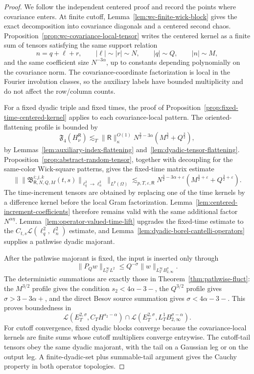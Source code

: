 \documentclass[10pt]{amsart}
\numberwithin{equation}{section}
\theoremstyle{plain}
\theoremstyle{definition}
\theoremstyle{remark}
\newcommand{\eps}{\varepsilon}
\begin{document}
\begin{proof}
We follow the independent centered proof and record the points where covariance enters.  At finite cutoff, Lemma~\ref{lem:wc-finite-wick-block} gives the exact decomposition into covariance diagonals and a centered second chaos.  Proposition~\ref{prop:wc-covariance-local-tensor} writes the centered kernel as a finite sum of tensors satisfying the same support relation
\[
        n=q+\ell+r,
        \qquad |\ell|\sim |r|\sim N,
        \qquad |q|\sim Q,
        \qquad |n|\sim M,
\]
and the same coefficient size $N^{-3\alpha}$, up to constants depending polynomially on the covariance norm.  The covariance-coordinate factorization is local in the Fourier involution classes, so the auxiliary labels have bounded multiplicity and do not affect the row/column counts.

For a fixed dyadic triple and fixed times, the proof of Proposition~\ref{prop:fixed-time-centered-kernel} applies to each covariance-local pattern.  The oriented-flattening profile is bounded by
\[
        \mathfrak F_4(H_{\nu}^{\mathsf R})
        \lesssim_T \|\mathsf R\|_{\kappa}^{O(1)}
        N^{\frac32-3\alpha}(M^{\frac32}+Q^{\frac32}),
\]
by Lemmas~\ref{lem:auxiliary-index-flattening} and~\ref{lem:dyadic-tensor-flattening}.  Proposition~\ref{prop:abstract-random-tensor}, together with decoupling for the same-color Wick-square patterns, gives the fixed-time matrix estimate
\[
 \bigl\|\|\mathfrak B_{\mathsf R,N,Q,M}^{i;j,k}(t,s)\|_{\ell_q^2\to\ell_n^2}\bigr\|_{L^p(\Omega)}
 \lesssim_{p,T,\eps,\mathsf R}
 N^{\frac32-3\alpha+\eps}(M^{\frac32+\eps}+Q^{\frac32+\eps}).
\]
The time-increment tensors are obtained by replacing one of the time kernels by a difference kernel before the local Gram factorization.  Lemma~\ref{lem:centered-increment-coefficients} therefore remains valid with the same additional factor $N^{\alpha\eta}$.  Lemma~\ref{lem:operator-valued-time-lift} upgrades the fixed-time estimate to the $C_{t,s}\mathcal L(\ell_q^2,\ell_n^2)$ estimate, and Lemma~\ref{lem:dyadic-borel-cantelli-operators} supplies a pathwise dyadic majorant.

After the pathwise majorant is fixed, the input is inserted only through
\[
        \|P_Qw\|_{L_T^\infty L^2}\le Q^{-\sigma}\|w\|_{L_T^\infty B_{2,\infty}^{\sigma}}.
\]
The deterministic summations are exactly those in Theorem~\ref{thm:pathwise-fluct}: the $M^{3/2}$ profile gives the condition $s_2<4\alpha-3-$, the $Q^{3/2}$ profile gives $\sigma>3-3\alpha+$, and the direct Besov source summation gives $\sigma<4\alpha-3-$.  This proves boundedness in
\[
        \mathcal L(E_T^{2,\sigma},C_TH^{s_2-\alpha})
        \cap
        \mathcal L(E_T^{2,\sigma},L_T^1B_{2,\infty}^{\sigma-\alpha}).
\]
For cutoff convergence, fixed dyadic blocks converge because the covariance-local kernels are finite sums whose cutoff multipliers converge entrywise.  The cutoff-tail tensors obey the same dyadic majorant, with the tail on a Gaussian leg or on the output leg.  A finite-dyadic-set plus summable-tail argument gives the Cauchy property in both operator topologies.
\end{proof}
\end{document}
